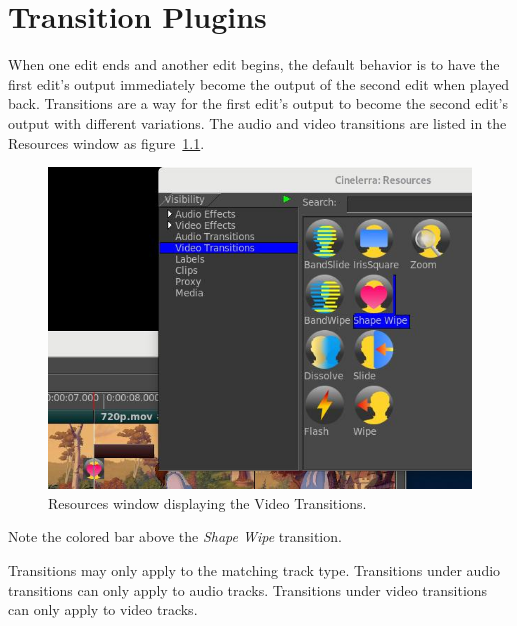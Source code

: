 \chapter{Transition Plugins}%
\label{cha:transition_plugin}

When one edit ends and another edit begins, the default behavior is to have the first edit's output immediately become the output of the second edit when played back. Transitions are a way for the first edit’s output to become the second edit’s output with different variations. The audio and video transitions are listed in the Resources window as figure~\ref{fig:transition}.

\begin{figure}[htpb]
    \centering
    \includegraphics[width=0.8\linewidth]{images/transition.png}
    \caption{Resources window displaying the Video Transitions.}
    \label{fig:transition}
\end{figure}

Note the colored bar above the \textit{Shape Wipe} transition.

Transitions may only apply to the matching track type. Transitions under audio transitions can only apply to audio tracks. Transitions under video transitions can only apply to video tracks.

